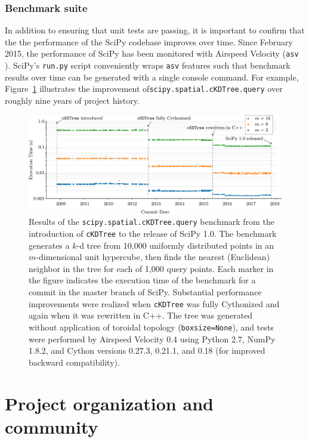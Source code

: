 \documentclass[fleqn,10pt]{wlscirep}
\begin{document}

\subsubsection*{Benchmark suite}

In addition to ensuring that unit tests are passing, it is important to confirm that the
the performance of the SciPy codebase improves over time. Since February 2015, the
performance of SciPy has been monitored with Airspeed Velocity (\texttt{asv} \cite{asvref}).
SciPy's \texttt{run.py} script conveniently wraps \texttt{asv} features such that benchmark 
results over time can be generated with a single console command. For example,
Figure~\ref{fig:asvbench} illustrates the improvement of\texttt{scipy.spatial.cKDTree.query}
over roughly nine years of project history.

\begin{figure}[H]
\centering
\includegraphics[width=\textwidth]{static/asv}
\caption{Results of the \texttt{scipy.spatial.cKDTree.query} benchmark from the introduction of \texttt{cKDTree} to the release of SciPy 1.0. The benchmark generates a $k$-d tree from 10,000 uniformly distributed points in an $m$-dimensional unit hypercube, then finds the nearest (Euclidean) neighbor in the tree for each of 1,000 query points. Each marker in the figure indicates the execution time of the benchmark for a commit in the master branch of SciPy. Substantial performance improvements were realized when \texttt{cKDTree} was fully Cythonized and again when it was rewritten in C++. The tree was generated without application of toroidal topology (\texttt{boxsize=None}), and tests were performed by Airspeed Velocity 0.4 using Python 2.7, NumPy 1.8.2, and Cython versions 0.27.3, 0.21.1, and 0.18 (for improved backward compatibility).}
\label{fig:asvbench}
\end{figure}

\section*{Project organization and community}
\end{document}

